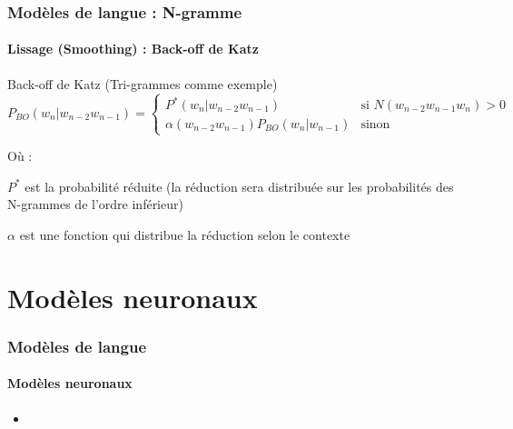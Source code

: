 \documentclass[xcolor=table]{beamer}
\begin{document}
\begin{frame}
\frametitle{Modèles de langue : N-gramme}
\framesubtitle{Lissage (Smoothing) : Back-off de Katz}

\begin{block}{Back-off de Katz (Tri-grammes comme exemple)}
	\[%
	P_{BO}(w_n | w_{n-2} w_{n-1}) = 
	\begin{cases}
	P^*(w_n | w_{n-2} w_{n-1}) & \text{si } N(w_{n-2} w_{n-1} w_n) > 0 \\
	\alpha(w_{n-2} w_{n-1}) P_{BO}(w_n | w_{n-1}) & \text{sinon}
	\end{cases}
	\]
	
	Où : 
	
	$P^*$ est la probabilité réduite (la réduction sera distribuée sur les probabilités des N-grammes de l'ordre inférieur)
	
	$\alpha$ est une fonction qui distribue la réduction selon le contexte
\end{block}
%
%
\end{frame}


\section{Modèles neuronaux}

\begin{frame}
\frametitle{Modèles de langue}
\framesubtitle{Modèles neuronaux}

\begin{itemize}
	\item 
\end{itemize}

\end{frame}
\end{document}
